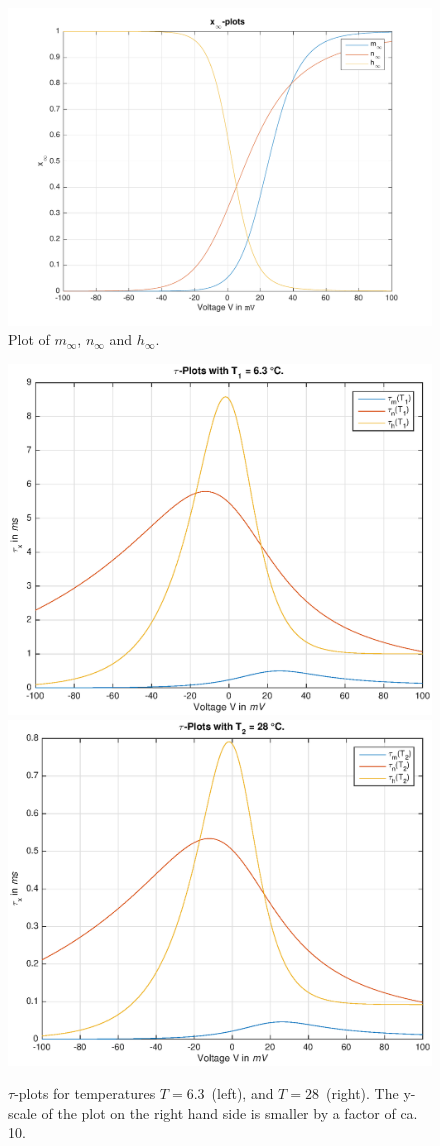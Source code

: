 \documentclass[
a4paper, 
12pt, 
]{article}
\begin{document}
		\begin{figure}[h]
			\centering
			\includegraphics[width=0.7\linewidth]{Plots/x_inf_plots-eps-converted-to}
			\caption{Plot of $m_{\infty}$, $n_{\infty}$ and $h_{\infty}$.}
			\label{fig:x_inf_plots}
		\end{figure}	
	\begin{figure}[h]
\centering
\includegraphics[width=0.45\linewidth]{Plots/tau_t_1}
\includegraphics[width=0.45\linewidth]{Plots/tau_t_2}
\caption{$\tau$-plots for temperatures $T=6.3$\textcelsius~(left), and $T=28$\textcelsius~(right). The y-scale of the plot on the right hand side is smaller by a factor of ca. 10.}
\label{fig:tau_t_1}
\end{figure}
\end{document}
